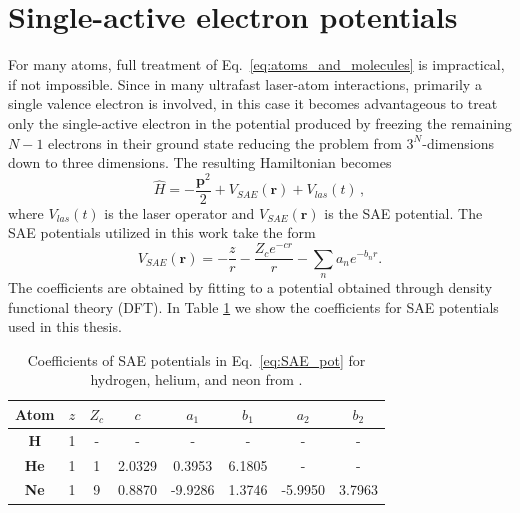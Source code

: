 \section{Single-active electron potentials}
\label{sec:SAE}
For many atoms, full treatment of Eq.~\ref{eq:atoms_and_molecules} is impractical, if not impossible. Since in many ultrafast laser-atom interactions, primarily a single valence electron is involved, in this case it becomes advantageous to treat only the single-active electron in the potential produced by freezing the remaining $N-1$ electrons in their ground state reducing the problem from $3^N$-dimensions down to three dimensions. The resulting Hamiltonian becomes
\begin{equation}
  \label{eq:SAE_TDSE}
  \hat{H} = -\frac{\mathbf{p}^2}{2} + V_{SAE}(\mathbf{r}) + V_{las}(t)\, ,
\end{equation}
where $V_{las}(t)$ is the laser operator and $V_{SAE}(\mathbf{r})$ is the SAE potential. The SAE potentials utilized in this work take the form \cite{reiff2020} 
\begin{equation}
  \label{eq:SAE_pot}
  V_{SAE}(\mathbf{r}) = - \frac{z}{r} - \frac{Z_c e^{-c r}}{r} - \sum_n a_n e^{-b_n r}.
\end{equation}
The coefficients are obtained by fitting to a potential obtained through density functional theory (DFT).  In Table \ref{tab:SAE} we show the coefficients for SAE potentials used in this thesis.
\begin{table}
\begin{center}
 \begin{tabular}{|c|c|c|c|c|c|c|c|} 
 \hline
 \textbf{Atom} & $z$ & $Z_c$ & $c$ & $a_1$ & $b_1$ & $a_2$ & $b_2$ \\
 \hline
 \textbf{H} & 1 & - & - &  - & - &  - & - \\ 
 \hline
 \textbf{He} & 1 & 1 & 2.0329 &  0.3953 & 6.1805 &  - & - \\ 
 \hline
 \textbf{Ne} & 1 & 9 & 0.8870 &  -9.9286 & 1.3746 &  -5.9950 & 3.7963 \\ 
 \hline
\end{tabular}
\end{center}
 \caption{Coefficients of SAE potentials in Eq.~\ref{eq:SAE_pot} for hydrogen, helium, and neon from \cite{reiff2020}.}
 \label{tab:SAE}
\end{table}



